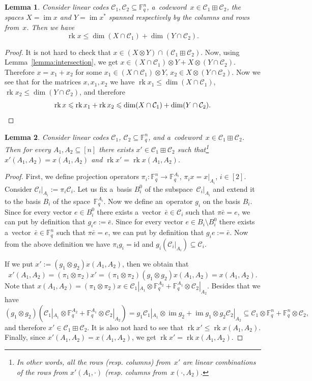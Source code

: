 \documentclass[11pt]{article}
\let\le\leqslant
\theoremstyle{plain}
\newtheorem{lemma}{Lemma}
\theoremstyle{definition}
\theoremstyle{remark}
\newcommand{\id}{\mathrm{id}}
\newcommand{\cC}{\mathcal{C}}
\newcommand{\F}{\mathbb{F}}
\DeclareMathOperator{\rk}{rk}
\DeclareMathOperator{\im}{im}
\begin{document}
\begin{lemma}\label{lemma:rk-bound}
    Consider linear codes $\cC_1,\cC_2\subseteq\F_q^n$, a~codeword~$x\in \cC_1\boxplus \cC_2$, the spaces $X=\im x$ and $Y=\im x^*$ spanned respectively by the columns and rows from~$x$. Then we have 
    \[\rk x\le \dim (X\cap \cC_1)+\dim (Y\cap \cC_2).\]
\end{lemma}
\begin{proof}
    It is not hard to check that $x\in (X\otimes Y)\cap (\cC_1\boxplus \cC_2)$. Now, using Lemma~\ref{lemma:intersection}, we get $x\in (X\cap \cC_1)\otimes Y+X\otimes (Y\cap \cC_2)$. Therefore 
    $x=x_1+x_2$ for some $x_1\in (X\cap \cC_1)\otimes Y$, $x_2\in X\otimes (Y\cap \cC_2)$.  
    Now we see that for the matrices $x, x_1, x_2$ we have $\rk x_1\le \dim (X\cap \cC_1)$, $\rk x_2\le \dim(Y\cap \cC_2)$, and therefore
    \begin{equation*}
        \rk x\le \rk x_1+\rk x_2\le \dim (X\cap \cC_1)+\dim (Y\cap \cC_2).\qedhere
    \end{equation*}
\end{proof}
\begin{lemma}\label{lemma:extend-cwpart}
Consider linear codes $\cC_1$, $\cC_2\subseteq \F_q^n$, and a~codeword~$x\in \cC_1\boxplus \cC_2$. Then for every $A_1,A_2\subseteq [n]$ there exists $x'\in \cC_1\boxplus \cC_2$ such that\footnote{In other words, all the rows (resp. columns) from~$x'$ are linear combinations of the rows from $x'(A_1,\cdot)$  (resp. columns from~$x(\cdot,A_2)$.} $x'(A_1, A_2)=x(A_1,A_2)$ and $\rk x'=\rk x(A_1,A_2)$.
\end{lemma}
\begin{proof}
    First, we define projection operators $\pi_i\colon \F_q^n\to \F_q^{A_i}$, $\pi_i x=x|_{A_i}$, $i\in [2]$. Consider $\cC_i|_{A_i}:=\pi_i\cC_i$. Let us fix a~basis $B^0_i$ of the subspace~$\cC_i|_{A_i}$ and extend it to the basis $B_i$ of the space~$\F_q^{A_i}$.
    Now we define an~operator $g_i$ on the basis $B_i$. Since for every vector $e\in B^0_i$ there exists a~vector~$\bar e\in \cC_i$ such that $\pi \bar e=e$, we can put by definition that $g_i e:=\bar e$. Since for every vector  $e\in B_i\setminus B^0_i$ there exists a~vector~$\bar e\in \F_q^n$ such that $\pi \bar e=e$, we can put by definition that $g_i e:=\bar e$. Now from the above definition we have $\pi_i g_i=\id$ and $g_i (\cC_i|_{A_i})\subseteq \cC_i$.
    
    If we put $x':=(g_1\otimes g_2) x(A_1,A_2)$, then we obtain that  %
    $$x'(A_1,A_2)=(\pi_1\otimes \pi_2)x'=(\pi_1\otimes \pi_2)(g_1\otimes g_2)x(A_1,A_2)=x(A_1,A_2).$$ 
    Note that $x(A_1,A_2)=(\pi_1\otimes \pi_2)x\in \cC_1|_{A_1}\otimes \F_q^{A_2}+\F_q^{A_1}\otimes \cC_2|_{A_2}$.
    Besides that we have 
    $$(g_1\otimes g_2)(\cC_1|_{A_1}\otimes \F_q^{A_2}+\F_q^{A_1}\otimes \cC_2|_{A_2})=g_1 \cC_1|_{A_1}\otimes \im g_2+\im g_1\otimes g_2 \cC_2|_{A_2}\subseteq \cC_1\otimes \F_q^n+\F_q^n\otimes \cC_2,
    $$
    and therefore $x'\in \cC_1\boxplus \cC_2$.
    It is also not hard to see that $\rk x'\le\rk x(A_1,A_2)$. Finally, since $x'(A_1,A_2)=x(A_1,A_2)$, we get $\rk x'=\rk x(A_1,A_2)$.
\end{proof}
\end{document}
